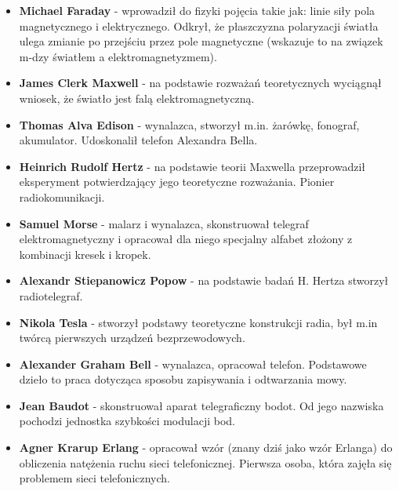 \documentclass[12pt,a4paper]{article}
\begin{document}
	\begin{itemize}
		\item \textbf{Michael Faraday} - wprowadził do fizyki pojęcia takie jak: linie siły pola magnetycznego i elektrycznego. Odkrył, że płaszczyzna polaryzacji światła ulega zmianie po przejściu przez pole magnetyczne (wskazuje to na związek m-dzy światłem a elektromagnetyzmem).
	
		\item \textbf{James Clerk Maxwell} - na podstawie rozważań teoretycznych wyciągnął wniosek, że światło jest falą elektromagnetyczną.
		
		\item \textbf{Thomas Alva Edison} - wynalazca, stworzył m.in. żarówkę, fonograf, akumulator. Udoskonalił telefon Alexandra Bella.
		
		\item \textbf{Heinrich Rudolf Hertz} - na podstawie teorii Maxwella przeprowadził eksperyment potwierdzający jego teoretyczne rozważania. Pionier radiokomunikacji.
		
		\item \textbf{Samuel Morse} - malarz i wynalazca, skonstruował telegraf elektromagnetyczny i opracował dla niego specjalny alfabet złożony z kombinacji kresek i kropek.
		
		\item \textbf{Alexandr Stiepanowicz Popow} - na podstawie badań H. Hertza stworzył radiotelegraf.
		
		\item \textbf{Nikola Tesla} - stworzył podstawy teoretyczne konstrukcji radia, był m.in twórcą pierwszych urządzeń bezprzewodowych.
		
		\item \textbf{Alexander Graham Bell} - wynalazca, opracował telefon. Podstawowe dzieło to praca dotycząca sposobu zapisywania i odtwarzania mowy.
		
		\item \textbf{Jean Baudot} - skonstruował aparat telegraficzny bodot. Od jego nazwiska pochodzi jednostka szybkości modulacji bod.
		
		\item \textbf{Agner Krarup Erlang} - opracował wzór (znany dziś jako wzór Erlanga) do obliczenia natężenia ruchu sieci telefonicznej. Pierwsza osoba, która zajęła się problemem sieci telefonicznych.
	\end{itemize}
\end{document}
